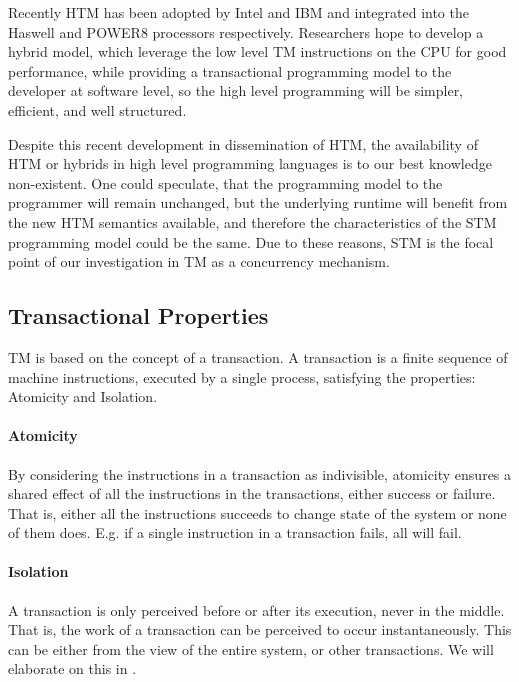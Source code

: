 Recently \ac{HTM} has been adopted by Intel and IBM and integrated into the Haswell and POWER8 processors respectively\cite{Anthes:2014:RSP:2684442.2667109}. Researchers hope to develop a hybrid model, which leverage the low level \ac{TM} instructions on the \ac{CPU} for good performance, while providing a transactional programming model to the developer at software level, so the high level programming will be simpler, efficient, and well structured\cite{Anthes:2014:RSP:2684442.2667109}.

Despite this recent development in dissemination of \ac{HTM}, the availability of \ac{HTM} or hybrids in high level programming languages is to our best knowledge non-existent. One could speculate, that the programming model to the programmer will remain unchanged, but the underlying runtime will benefit from the new \ac{HTM} semantics available, and therefore the characteristics of the \ac{STM} programming model could be the same. Due to these reasons, \ac{STM} is the focal point of our investigation in \ac{TM} as a concurrency mechanism. 

\subsection{Transactional Properties}
\ac{TM} is based on the concept of a transaction. A transaction is a finite sequence of machine instructions, executed by a single process, satisfying the properties: Atomicity and Isolation\cite[p. 2]{herlihy2011tm}.

\paragraph{Atomicity} By considering the instructions in a transaction as indivisible, atomicity ensures a shared effect of all the instructions in the transactions, either success or failure. That is, either all the instructions succeeds to change state of the system or none of them does. E.g. if a single instruction in a transaction fails, all will fail.
\paragraph{Isolation} A transaction is only perceived before or after its execution, never in the middle. That is, the work of a transaction can be perceived to occur instantaneously. This can be either from the view of the entire system, or other transactions. We will elaborate on this in .

